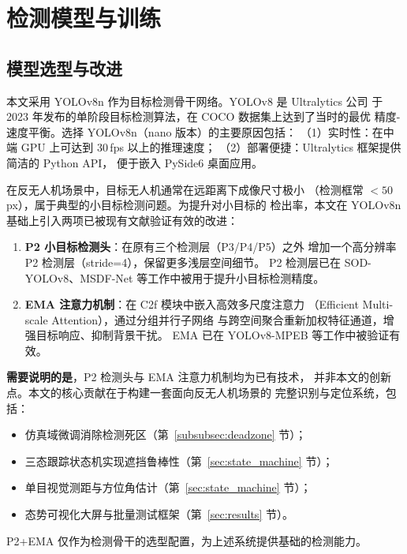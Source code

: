 \documentclass[12pt, a4paper]{ctexart}
\begin{document}
\section{检测模型与训练}
\label{sec:model}

\subsection{模型选型与改进}

本文采用 YOLOv8n 作为目标检测骨干网络。YOLOv8 是 Ultralytics 公司
于 2023 年发布的单阶段目标检测算法，在 COCO 数据集上达到了当时的最优
精度-速度平衡。选择 YOLOv8n（nano 版本）的主要原因包括：
（1）实时性：在中端 GPU 上可达到 30\,fps 以上的推理速度；
（2）部署便捷：Ultralytics 框架提供简洁的 Python API，
便于嵌入 PySide6 桌面应用。

在反无人机场景中，目标无人机通常在远距离下成像尺寸极小
（检测框常 $< 50$\,px），属于典型的小目标检测问题。为提升对小目标的
检出率，本文在 YOLOv8n 基础上引入两项已被现有文献验证有效的改进：

\begin{enumerate}
  \item \textbf{P2 小目标检测头}：在原有三个检测层（P3/P4/P5）之外
        增加一个高分辨率 P2 检测层（stride=4），保留更多浅层空间细节。
        P2 检测层已在 SOD-YOLOv8\cite{sod_yolov8}、MSDF-Net\cite{msdf_net}
        等工作中被用于提升小目标检测精度。

  \item \textbf{EMA 注意力机制}：在 C2f 模块中嵌入高效多尺度注意力
        （Efficient Multi-scale Attention）\cite{ema}，通过分组并行子网络
        与跨空间聚合重新加权特征通道，增强目标响应、抑制背景干扰。
        EMA 已在 YOLOv8-MPEB\cite{yolov8_mpeb} 等工作中被验证有效。
\end{enumerate}

\textbf{需要说明的是}，P2 检测头与 EMA 注意力机制均为已有技术，
并非本文的创新点。本文的核心贡献在于构建一套面向反无人机场景的
完整识别与定位系统，包括：
\begin{itemize}
  \item 仿真域微调消除检测死区（第~\ref{subsubsec:deadzone} 节）；
  \item 三态跟踪状态机实现遮挡鲁棒性（第~\ref{sec:state_machine} 节）；
  \item 单目视觉测距与方位角估计（第~\ref{sec:state_machine} 节）；
  \item 态势可视化大屏与批量测试框架（第~\ref{sec:results} 节）。
\end{itemize}
P2+EMA 仅作为检测骨干的选型配置，为上述系统提供基础的检测能力。
\end{document}
